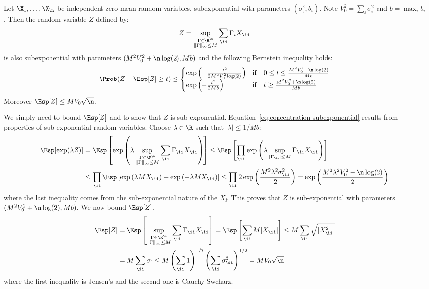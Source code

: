 \begin{proposition}
\label{prop:concentration-subexponential}
Let $\X_{1}, \dots, \X_{\n}$ be independent zero mean random variables, subexponential with parameters $(\sigma_i^2, b_i)$. Note $V_0^2  = \sum_{\ii} \sigma_i^2$ and $b = \max_{i} b_i$. Then the random variable $Z$ defined by:
\begin{equation*}
  Z = \sup_{\substack{\Gamma \in \R^{\n} \\ \|\Gamma \|_{\infty} \leq M}} \sum_{\ii} \Gamma_i X_{\ii}
\end{equation*}
is also subexponential with parameters $(M^2 V_0^2 + \n \log(2), Mb)$ and the following Bernstein inequality holds:
\begin{equation}
  \label{eq:concentration-subexponential}
  \Prob( Z - \Esp[Z] \geq t) \leq 
  \begin{cases} 
    \exp\left( - \frac{t^2}{2 M^2 V_0^2 \log(2)}\right)  & \text{if} \quad 0 \leq t \leq \frac{M^2 V_0^2 + \n \log(2)}{Mb} \\ 
    \exp\left( - \frac{t^2}{2Mb}\right)  & \text{if} \quad t \geq \frac{M^2 V_0^2 + \n \log(2)}{Mb}
  \end{cases}
\end{equation}
Moreover $\Esp[Z] \leq M V_0 \sqrt{\n}$. 
\end{proposition}

\proofbegin
We simply need to bound $\Esp[Z]$ and to show that $Z$ is sub-exponential. Equation~\eqref{eq:concentration-subexponential} results from properties of sub-exponential random variables. Choose $\lambda \in \R$ such that $|\lambda| \leq 1/Mb$: 
\begin{align*}
\Esp[\exp(\lambda Z)] & = \Esp\left[ \exp\left( \lambda \sup_{\substack{\Gamma \in \R^{\n} \\ \|\Gamma \|_{\infty} \leq M}} \sum_{\ii} \Gamma_{\ii} X_{\ii} \right)\right] \leq \Esp\left[ \prod_{\ii} \exp\left( \lambda \sup_{| \Gamma_{\ii} | \leq M}  \Gamma_{\ii} X_{\ii} \right)\right] \\ & \leq \prod_{\ii}  \Esp\left[  \exp\left( \lambda M X_{\ii} \right) + \exp\left( -\lambda M X_{\ii} \right)\right] \leq \prod_{\ii}  2\exp\left( \frac{M^2 \lambda^2 \sigma_{\ii}^2}{2}\right) = \exp\left( \frac{M^2 \lambda^2 V_0^2 + \n \log(2)}{2}\right)
\end{align*}
where the last inequality comes from the sub-exponential nature of the $X_{\ii}$. This proves that $Z$ is sub-exponential with parameters $(M^2 V_0^2 + \n \log(2), Mb)$. We now bound $\Esp[Z]$. 
\begin{align*}
  \Esp[Z] & = \Esp \left[ \sup_{\substack{\Gamma \in \R^{\n} \\ \|\Gamma \|_{\infty} \leq M}}  \sum_{\ii} \Gamma_{\ii} X_{\ii} \right] = \Esp \left[ \sum_{\ii} M |X_{\ii}| \right] \leq M \sum_{\ii} \sqrt{[ X_{\ii}^2 ]} \\ & 
  = M \sum_{\ii} \sigma_i \leq M \left( \sum_{\ii} 1 \right)^{1/2} \left( \sum_{\ii} \sigma_{\ii}^2 \right)^{1/2} = M V_0\sqrt{\n}
\end{align*}
where the first inequality is Jensen's and the second one is Cauchy-Swcharz. 

